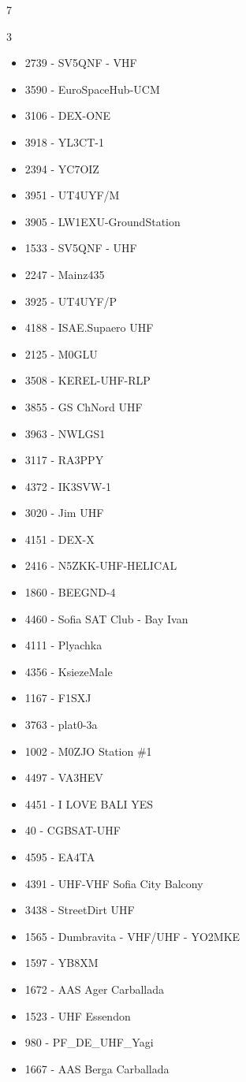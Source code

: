 \documentclass[oneside,a4paper,12pt]{book}
\begin{document}
\begin{thebibliography}{7}
\begin{multicols}{3}
\begin{itemize}
    \item 2739 - SV5QNF - VHF
    \item 3590 - EuroSpaceHub-UCM
    \item 3106 - DEX-ONE
    \item 3918 - YL3CT-1
    \item 2394 - YC7OIZ
    \item 3951 - UT4UYF/M
    \item 3905 - LW1EXU-GroundStation
    \item 1533 - SV5QNF - UHF
    \item 2247 - Mainz435
    \item 3925 - UT4UYF/P
    \item 4188 - ISAE.Supaero UHF
    \item 2125 - M0GLU
    \item 3508 - KEREL-UHF-RLP
    \item 3855 - GS ChNord UHF
    \item 3963 - NWLGS1
    \item 3117 - RA3PPY
    \item 4372 - IK3SVW-1
    \item 3020 - Jim UHF
    \item 4151 - DEX-X
    \item 2416 - N5ZKK-UHF-HELICAL
    \item 1860 - BEEGND-4
    \item 4460 - Sofia SAT Club - Bay Ivan
    \item 4111 - Plyachka
    \item 4356 - KsiezeMale
    \item 1167 - F1SXJ
    \item 3763 - plat0-3a
    \item 1002 - M0ZJO Station \#1
    \item 4497 - VA3HEV
    \item 4451 - I LOVE BALI YES
    \item 40 - CGBSAT-UHF
    \item 4595 - EA4TA
    \item 4391 - UHF-VHF Sofia City Balcony
    \item 3438 - StreetDirt UHF
    \item 1565 - Dumbravita - VHF/UHF - YO2MKE
    \item 1597 - YB8XM
    \item 1672 - AAS Ager Carballada
    \item 1523 - UHF Essendon
    \item 980 - PF\_DE\_UHF\_Yagi
    \item 1667 - AAS Berga Carballada
\end{itemize}
\end{multicols}

\end{thebibliography}
\end{document}
